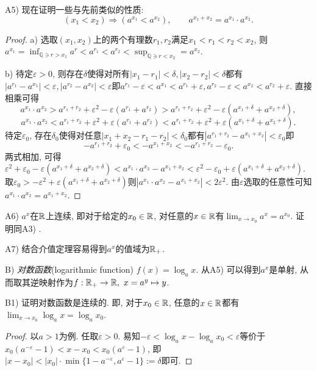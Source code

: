 \vspace{0.5em}
A5) 现在证明一些与先前类似的性质: 
$$(x_1 < x_2) \Rightarrow (a^{x_1} < a^{x_2}), \qquad a^{x_1+x_2} = a^{x_1} \cdot a^{x_2}.$$

\begin{proof}
	a) 选取$(x_1,x_2)$上的两个有理数$r_1,r_2$满足$x_1<r_1<r_2<x_2$, 则$a^{x_1} = \inf_{\mathbb{Q} \ni r > x_1} a^r < a^{r_1} < a^{r_2} < \sup_{\mathbb{Q} \ni r < x_2}=a^{x_2}$.
	
	b) 待定$\varepsilon >0$, 则存在$\delta$使得对所有$|x_1-r_1|<\delta ,|x_2-r_2|<\delta$都有$|a^{r_1}-a^{x_1}|<\varepsilon ,|a^{r_2}-a^{x_2}|<\varepsilon$即$a^{r_1}-\varepsilon < a^{x_1} < a^{r_1} + \varepsilon , a^{r_2}-\varepsilon < a^{x_2} < a^{r_2} + \varepsilon$. 直接相乘可得$$a^{x_1} \cdot a^{x_2} > a^{r_1+r_2}+\varepsilon ^2 - \varepsilon (a^{r_1}+a^{r_2}) > a^{r_1+r_2}+\varepsilon ^2 - \varepsilon (a^{x_1+\delta}+a^{x_2+\delta}),$$
		$$a^{x_1} \cdot a^{x_2} < a^{r_1+r_2}+\varepsilon ^2 + \varepsilon (a^{r_1}+a^{r_2}) < a^{r_1+r_2}+\varepsilon ^2 + \varepsilon (a^{x_1+\delta}+a^{x_2+\delta}).$$
	待定$\varepsilon _0$, 存在$\delta _0$使得对任意$|x_1+x_2-r_1-r_2|<\delta _0$都有$|a^{r_1+r_2} - a^{x_1+x_2}|<\varepsilon _0$即$$-a^{r_1+r_2} + \varepsilon _0 < -a^{x_1+x_2} < -a^{r_1+r_2} - \varepsilon _0.$$
	两式相加, 可得$\varepsilon ^2+\varepsilon _0 - \varepsilon (a^{x_1+\delta}+a^{x_2+\delta}) < a^{x_1} \cdot a^{x_2} - a^{x_1+x_2} < \varepsilon ^2 -\varepsilon _0 + \varepsilon (a^{x_1+\delta}+a^{x_2+\delta})$. 取$\varepsilon _0 > -\varepsilon ^2 + \varepsilon (a^{x_1+\delta}+a^{x_2+\delta})$则$|a^{x_1} \cdot a^{x_2} - a^{x_1+x_2} |< 2\varepsilon ^2$. 由$\varepsilon$选取的任意性可知$a^{x_1} \cdot a^{x_2} = a^{x_1+x_2}$. 
\end{proof}

A6) $a^x$在$\mathbb{R}$上连续, 即对于给定的$x_0 \in \mathbb{R}$, 对任意的$x \in \mathbb{R}$有$\lim_{x \to x_0} a^x = a^{x_0}$. 证明同A3) .

A7) 结合介值定理容易得到$a^x$的值域为$\mathbb{R} _+$.

\vspace{1em}
B) \textit{对数函数}(logarithmic function) $f(x)=\log_a{x}$. 从A5) 可以得到$a^x$是单射, 从而取其逆映射作为$f:\mathbb{R} _+ \to \mathbb{R} ,~x=a^y \mapsto y$.

B1) 证明对数函数是连续的. 即, 对于$x_0 \in \mathbb{R}$, 任意的$x \in \mathbb{R}$都有$\lim_{x \to x_0} \log_a{x} = \log_a{x_0}$. 

\begin{proof}
	以$a>1$为例. 任取$\varepsilon >0$. 易知$-\varepsilon < \log_a{x} - \log_a{x_0} < \varepsilon$等价于$x_0(a^{-\varepsilon}-1) < x-x_0 < x_0(a^{\varepsilon}-1)$, 即$|x-x_0|<|x_0| \cdot \min \{ 1-a^{-\varepsilon},a^{\varepsilon}-1 \} :=\delta$即可. 
\end{proof}

